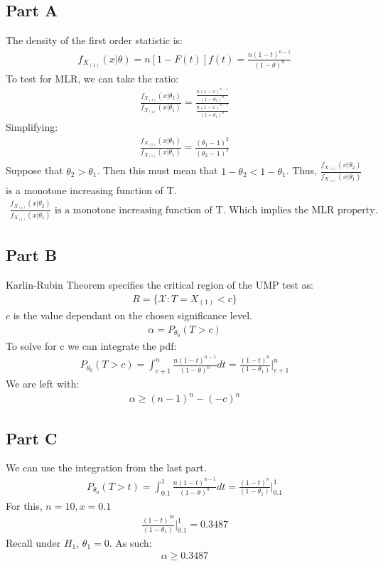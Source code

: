 \documentclass{article}
\begin{document}
\subsection*{Part A}
The density of the first order statistic is:
\begin{align*}
f_{X_{(1)}}(x|\theta) = n[1-F(t)]f(t) = \frac{n (1-t)^{n-1}}{(1-\theta)^n}
\end{align*}
To test for MLR, we can take the ratio:
\begin{align*}
\frac{f_{X_{(1)}}(x|\theta_2)}{f_{X_{(1)}}(x|\theta_1)} = \frac{\frac{n (1-x)^{n-1}}{(1-\theta_2)^n}}{\frac{n (1-x)^{n-1}}{(1-\theta_1)^n}}
\end{align*}
Simplifying:
\begin{align*}
\frac{f_{X_{(1)}}(x|\theta_2)}{f_{X_{(1)}}(x|\theta_1)} = \frac{(\theta_1-1)^2}{(\theta_2-1)^2}
\end{align*}
Suppose that $\theta_2>\theta_1$. Then this must mean that $1-\theta_2<1-\theta_1$. Thus, $\frac{f_{X_{(1)}}(x|\theta_2)}{f_{X_{(1)}}(x|\theta_1)}$ is a monotone increasing function of T.
\begin{align*}
\boxed{ \frac{f_{X_{(1)}}(x|\theta_2)}{f_{X_{(1)}}(x|\theta_1)} \text{ is a monotone increasing function of T. Which implies the MLR property.} }
\end{align*}
\subsection*{Part B}
Karlin-Rubin Theorem specifies the critical region of the UMP test as:
\begin{align*}
R = \{ \mathcal{X} : T = X_{(1)} < c \}
\end{align*}
$c$ is the value dependant on the chosen significance level.
\begin{align*}
\alpha = P_{\theta_0}(T>c)
\end{align*}
To solve for c we can integrate the pdf:
\begin{align*}
P_{\theta_0}(T>c) = \int_{c+1}^{n} \frac{n (1-t)^{n-1}}{(1-\theta)^n} dt = \frac{(1-t)^n}{(1-\theta_1)}|^{n}_{c+1}
\end{align*}
We are left with:
\begin{align*}
\boxed{ \alpha \geq (n-1)^n - (-c)^n }
\end{align*}
\subsection*{Part C}
We can use the integration from the last part.
\begin{align*}
P_{\theta_0}(T>t) = \int_{0.1}^{1} \frac{n (1-t)^{n-1}}{(1-\theta)^n} dt = \frac{(1-t)^n}{(1-\theta_1)}|^{1}_{0.1}
\end{align*}
For this, $n=10,x=0.1$
\begin{align*}
\frac{(1-t)^{10}}{(1-\theta_1)}|^{1}_{0.1} = 0.3487
\end{align*}
Recall under $H_1$, $\theta_1=0$. As such:
\begin{align*}
\boxed{ \alpha \geq 0.3487 }
\end{align*}
\end{document}
